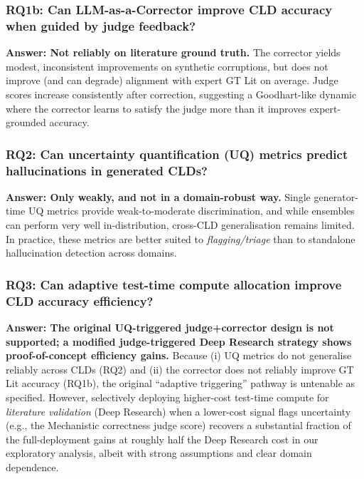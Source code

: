 \subsubsection*{RQ1b: Can LLM-as-a-Corrector improve CLD accuracy when guided by judge feedback?}
\textbf{Answer: Not reliably on literature ground truth.} The corrector yields modest, inconsistent improvements on synthetic corruptions, but does not improve (and can degrade) alignment with expert GT Lit on average. Judge scores increase consistently after correction, suggesting a Goodhart-like dynamic where the corrector learns to satisfy the judge more than it improves expert-grounded accuracy.

\subsubsection*{RQ2: Can uncertainty quantification (UQ) metrics predict hallucinations in generated CLDs?}
\textbf{Answer: Only weakly, and not in a domain-robust way.} Single generator-time UQ metrics provide weak-to-moderate discrimination, and while ensembles can perform very well in-distribution, cross-CLD generalisation remains limited. In practice, these metrics are better suited to \textit{flagging/triage} than to standalone hallucination detection across domains.

\subsubsection*{RQ3: Can adaptive test-time compute allocation improve CLD accuracy efficiency?}
\textbf{Answer: The original UQ-triggered judge+corrector design is not supported; a modified judge-triggered Deep Research strategy shows proof-of-concept efficiency gains.} Because (i) UQ metrics do not generalise reliably across CLDs (RQ2) and (ii) the corrector does not reliably improve GT Lit accuracy (RQ1b), the original ``adaptive triggering'' pathway is untenable as specified. However, selectively deploying higher-cost test-time compute for \textit{literature validation} (Deep Research) when a lower-cost signal flags uncertainty (e.g., the Mechanistic correctness judge score) recovers a substantial fraction of the full-deployment gains at roughly half the Deep Research cost in our exploratory analysis, albeit with strong assumptions and clear domain dependence.

